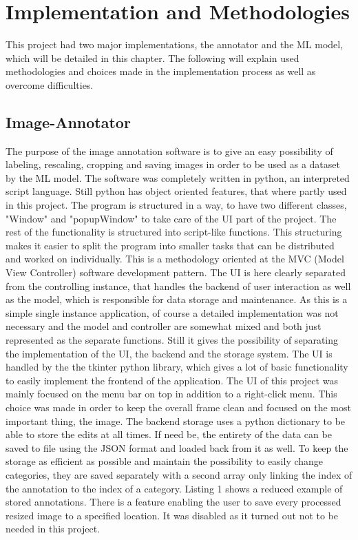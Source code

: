 \section{Implementation and Methodologies}

This project had two major implementations, the annotator and the ML model,
which will be detailed in this chapter. The following will explain used
methodologies and choices made in the implementation process as well as overcome
difficulties. 

\subsection{Image-Annotator}

The purpose of the image annotation software is to give an easy possibility of
labeling, rescaling, cropping and saving images in order to be used as a dataset
by the ML model.
\newline
The software was completely written in python, an interpreted script language.
Still python has object oriented features, that where partly used in this
project. 
\newline
The program is structured in a way, to have two different classes,
"Window" and "popupWindow" to take care of the UI part of the project. The rest
of the functionality is structured into script-like functions. This structuring
makes it easier to split the program into smaller tasks that can be distributed
and worked on individually. This is a methodology oriented at the MVC (Model
View Controller) software development pattern. The UI is here clearly separated
from the controlling instance, that handles the backend of user interaction as
well as the model, which is responsible for data storage and maintenance. As
this is a simple single instance application, of course a detailed
implementation was not necessary and the model and controller are somewhat mixed
and both just represented as the separate functions. Still it gives the
possibility of separating the implementation of the UI, the backend and the
storage system.
\newline
The UI is handled by the the tkinter python library, which gives a lot of basic
functionality to easily implement the frontend of the application. The UI of
this project was mainly focused on the menu bar on top in addition to a
right-click menu. This choice was made in order to keep the overall frame clean
and focused on the most important thing, the image.
\newline
The backend storage uses a python dictionary to be able to store the edits at all times.
If need be, the entirety of the data can be saved to file using
the JSON format and loaded back from it as well. To keep the storage as
efficient as possible and maintain the possibility to easily change categories,
they are saved separately with a second array only linking the index of
the annotation to the index of a category. Listing 1 shows a reduced example of
stored annotations. There is a feature enabling the user to save every processed
resized image to a specified location. It was disabled as it turned out not to
be needed in this project. 

